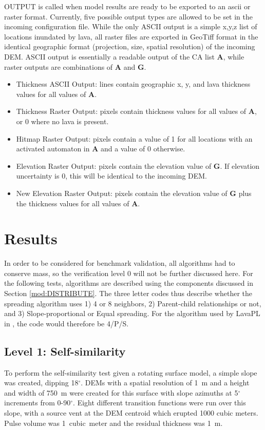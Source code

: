\documentclass[12pt,letter]{article}
\begin{document}
			OUTPUT is called when model results are ready to be exported to an ascii or raster format. Currently, five possible output types are allowed to be set in the incoming configuration file. While the only ASCII output is a simple x,y,z list of locations inundated by lava, all raster files are exported in GeoTiff format in the identical geographic format (projection, size, spatial resolution) of the incoming DEM. ASCII output is essentially a readable output of the CA list \textbf{A}, while raster outputs are combinations of \textbf{A} and \textbf{G}.
			\begin{itemize}
			\item Thickness ASCII Output: lines contain geographic x, y, and lava thickness values for all values of \textbf{A}.
			\item Thickness Raster Output: pixels contain thickness values for all values of \textbf{A}, or 0 where no lava is present.
			\item Hitmap Raster Output: pixels contain a value of 1 for all locations with an activated automaton in \textbf{A} and a value of 0 otherwise.
			\item Elevation Raster Output: pixels contain the elevation value of \textbf{G}. If elevation uncertainty is 0, this will be identical to the incoming DEM.
			\item New Elevation Raster Output: pixels contain the elevation value of \textbf{G} plus the thickness values for all values of \textbf{A}.
			\end{itemize}
			



\section{Results}
	
	In order to be considered for benchmark validation, all algorithms had to conserve mass, so the verification level 0 will not be further discussed here. For the following tests, algorithms are described using the components discussed in Section \ref{mod:DISTRIBUTE}. The three letter codes thus describe whether the spreading algorithm uses 1) 4 or 8 neighbors, 2) Parent-child relationships or not, and 3) Slope-proportional or Equal spreading. For the algorithm used by LavaPL in \citet{connor2012}, the code would therefore be 4/P/S.

	\subsection{Level 1: Self-similarity}
	To perform the self-similarity test given a rotating surface model, a simple slope was created, dipping 18$^{\circ}$. DEMs with a spatial resolution of 1~m and a height and width of 750~m were created for this surface with slope azimuths at 5$^{\circ}$ increments from 0-90$^{\circ}$. Eight different transition functions were run over this slope, with a source vent at the DEM centroid which erupted 1000 cubic meters. Pulse volume was 1~cubic~meter and the residual thickness was 1~m.
	
\end{document}

